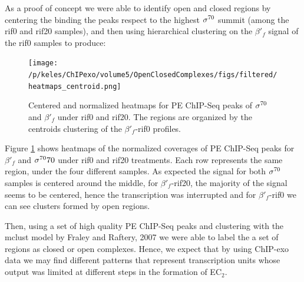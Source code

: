 \documentclass[11pt]{article}\usepackage[]{graphicx}\usepackage[]{color}
\begin{document}

As a proof of concept we were able to identify open and closed regions
by centering the binding the peaks respect to the highest $\sigma^{70}$
summit (among the rif0 and rif20 samples), and then using hierarchical
clustering on the $\beta'_f$ signal of the rif0 samples to produce:

\begin{figure}[H]
  \centering
 \texttt{[image: /p/keles/ChIPexo/volume5/OpenClosedComplexes/figs/filtered/heatmaps\_centroid.png]}
 \caption{Centered and normalized heatmaps for PE ChIP-Seq peaks of
   $\sigma^{70}$ and $\beta'_f$ under rif0 and rif20. The regions are
   organized by the centroids clustering of the $\beta'_f$-rif0
   profiles.}
  \label{fig:hm1}
\end{figure}

Figure \ref{fig:hm1} shows heatmaps of the normalized coverages of PE
ChIP-Seq peaks for $\beta'_f$ and $\sigma^{70}70$ under rif0 and rif20
treatments. Each row represents the same region, under the four
different samples. As expected the signal for both $\sigma^{70}$ samples is
centered around the middle, for $\beta'_f$-rif20, the majority of the
signal seems to be centered, hence the transcription was interrupted
and for $\beta'_f$-rif0 we can see clusters formed by open regions.

Then, using a set of high quality PE ChIP-Seq peaks and clustering
with the mclust model by Fraley and Raftery, 2007 \cite{mclust} we
were able to label the a set of regions as closed or open
complexes. Hence, we expect that by using ChIP-exo data we may find
different patterns that represent transcription units whose output was
limited at different steps in the formation of EC$_2$.
\end{document}
